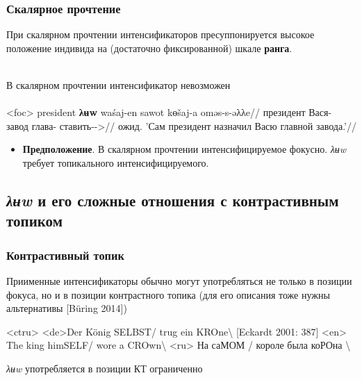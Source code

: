 \documentclass{beamer}
\begin{document}
\begin{frame}
    \frametitle{Скалярное прочтение}

    При скалярном прочтении интенсификаторов пресуппонируется высокое положение индивида на (достаточно фиксированной) шкале \textbf{ранга}.


    \pause

    ~\\В скалярном прочтении интенсификатор невозможен\\~\\
        
    \ex<foc>\begingl
    \gla\ljudge{*}president \textbf{λʉw} waśaj-en sawot kɵšaj-a oməs-s-əλλe//
    \glb президент \Int{} Вася-\Pssg{} завод глава-\Dat{} ставить-\Pst{}-\Tsg{}>\Sg{}//
    \glft ожид. 'Сам президент назначил Васю главной завода.'//
    \endgl
    \xe

    \pause

    \begin{itemize}
        \item \textbf{Предположение}. В скалярном прочтении интенсифицируемое фокусно. \textit{λʉw} требует топикального интенсифицируемого.
    \end{itemize}
\end{frame}

\subsection{\textit{λʉw} и его сложные отношения с контрастивным топиком}

\begin{frame}
    \frametitle{Контрастивный топик}

    Приименные интенсификаторы обычно могут употребляться не только в позиции фокуса, но и в позиции контрастного топика (для его описания тоже нужны альтернативы [Büring 2014])

    \pex<ctru>
        \a<de>Der König \uppercase{selbst}/ trug ein \uppercase{kro}ne\textbackslash{} [Eckardt 2001: 387]
        \a<en> The king himSELF/ wore a CROwn\textbackslash
        \a<ru> На саМОМ / короле была коРОна \textbackslash
    \xe

    \textit{λʉw} употребляется в позиции КТ ограниченно
    

\end{frame}
\end{document}
